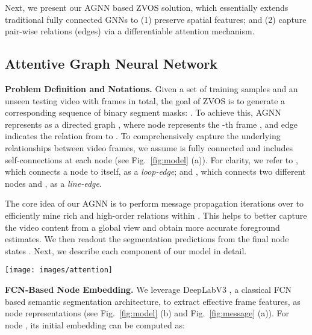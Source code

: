 \documentclass[10pt,twocolumn,letterpaper]{article}
\begin{document}
Next, we present our AGNN based ZVOS solution, which essentially extends traditional fully connected GNNs to (1) preserve spatial features; and (2) capture pair-wise relations (edges) via a differentiable attention mechanism.
\vspace*{-2pt}	
\subsection{Attentive Graph Neural Network}\label{sec:agnn}
	\vspace*{-1pt}	
\noindent\textbf{Problem Definition and Notations.} Given a set of training samples and an unseen testing video  with  frames in total, the goal of ZVOS is to generate a corresponding sequence of binary segment masks: .
To achieve this, AGNN represents  as a directed graph , where node  represents the -th frame , and edge  indicates the relation from  to . To comprehensively capture the underlying relationships between video frames, we assume  is fully connected and includes self-connections at each node (see Fig.~\ref{fig:model} (a)). For clarity, we refer to , which connects a node  to itself, as a \textit{loop-edge}; and , which connects two different nodes  and , as a \textit{line-edge}.

The core idea of our AGNN  is to perform  message propagation iterations over  to efficiently mine rich and high-order relations within . This helps to better capture the video content from a global view and obtain more accurate foreground estimates. We then readout the segmentation predictions  from the final node states . Next, we describe each component of our model in detail.

\begin{figure*}[t]
\centering
      \texttt{[image: images/attention]}
\vspace{-22pt}
\caption{\small Detailed illustration of our (a) node embedding, (b) intra-attention based loop-edge embedding and corresponding loop-message generation, (c) inter-attention based straight-edge embedding and corresponding neighbor message generation. }\label{fig:message}
\vspace{-12pt}
\end{figure*}



\noindent\textbf{FCN-Based Node Embedding.} We leverage DeepLabV3 \cite{DBLP:journals/corr/ChenPSA17}, a classical FCN based semantic segmentation architecture, to extract effective frame features, as node representations  (see Fig.~\ref{fig:model} (b) and Fig.~\ref{fig:message} (a)). For node , its initial embedding  can be computed as:
	\vspace*{-4pt}
\end{document}

